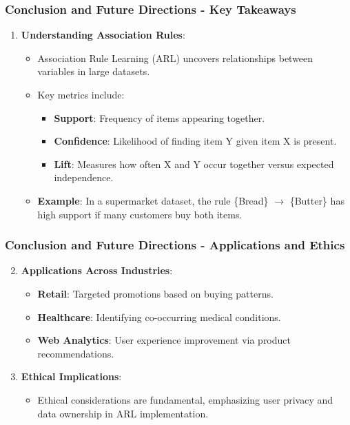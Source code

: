 \documentclass{beamer}
\begin{document}
\begin{frame}[fragile]
    \frametitle{Conclusion and Future Directions - Key Takeaways}
    \begin{enumerate}
        \item \textbf{Understanding Association Rules}:
        \begin{itemize}
            \item Association Rule Learning (ARL) uncovers relationships between variables in large datasets.
            \item Key metrics include:
            \begin{itemize}
                \item \textbf{Support}: Frequency of items appearing together.
                \item \textbf{Confidence}: Likelihood of finding item Y given item X is present.
                \item \textbf{Lift}: Measures how often X and Y occur together versus expected independence.
            \end{itemize}
            \item \textbf{Example}: In a supermarket dataset, the rule \{Bread\} $\to$ \{Butter\} has high support if many customers buy both items.
        \end{itemize}
    \end{enumerate}
\end{frame}

\begin{frame}[fragile]
    \frametitle{Conclusion and Future Directions - Applications and Ethics}
    \begin{enumerate}
        \setcounter{enumi}{1}
        \item \textbf{Applications Across Industries}:
        \begin{itemize}
            \item \textbf{Retail}: Targeted promotions based on buying patterns.
            \item \textbf{Healthcare}: Identifying co-occurring medical conditions.
            \item \textbf{Web Analytics}: User experience improvement via product recommendations.
        \end{itemize}
        
        \item \textbf{Ethical Implications}:
        \begin{itemize}
            \item Ethical considerations are fundamental, emphasizing user privacy and data ownership in ARL implementation.
        \end{itemize}
    \end{enumerate}
\end{frame}
\end{document}
